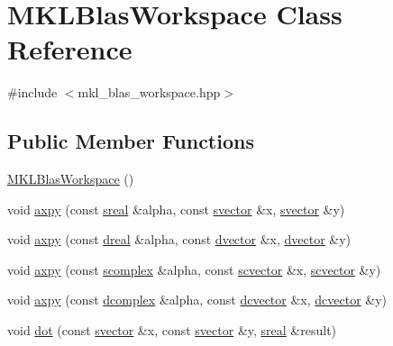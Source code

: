 \hypertarget{classMKLBlasWorkspace}{}\section{M\+K\+L\+Blas\+Workspace Class Reference}
\label{classMKLBlasWorkspace}


{\ttfamily \#include $<$mkl\+\_\+blas\+\_\+workspace.\+hpp$>$}

\subsection*{Public Member Functions}
\begin{DoxyCompactItemize}
\item 
\hyperlink{classMKLBlasWorkspace_a9aa5a080a9d51a2ea28177ae28b0ff44}{M\+K\+L\+Blas\+Workspace} ()
\item 
void \hyperlink{classMKLBlasWorkspace_a2582bcb54c81598e220d0120962b3a73}{axpy} (const \hyperlink{mkl__blas__workspace_8hpp_a10d897016764eb88fb8f180dcb1c8e1f}{sreal} \&alpha, const \hyperlink{mkl__blas__workspace_8hpp_a77c9c48c9aa9a7e72a489399e25b194b}{svector} \&x, \hyperlink{mkl__blas__workspace_8hpp_a77c9c48c9aa9a7e72a489399e25b194b}{svector} \&y)
\item 
void \hyperlink{classMKLBlasWorkspace_a5efedee62b0920bce8ff4112b7c29ea6}{axpy} (const \hyperlink{mkl__blas__workspace_8hpp_a7a5d10f247d1e172d0a54c8593e3e6a1}{dreal} \&alpha, const \hyperlink{mkl__blas__workspace_8hpp_a0bb644a430db3157d9ece9dc8fee2884}{dvector} \&x, \hyperlink{mkl__blas__workspace_8hpp_a0bb644a430db3157d9ece9dc8fee2884}{dvector} \&y)
\item 
void \hyperlink{classMKLBlasWorkspace_a5a0bcbcb3f1a20ccd57a4f21f2faa2e8}{axpy} (const \hyperlink{mkl__blas__workspace_8hpp_a06b0d8b7af9e07e86d8bd289f689899c}{scomplex} \&alpha, const \hyperlink{mkl__blas__workspace_8hpp_aea885c50e28a9bce0e30be490ca106f9}{scvector} \&x, \hyperlink{mkl__blas__workspace_8hpp_aea885c50e28a9bce0e30be490ca106f9}{scvector} \&y)
\item 
void \hyperlink{classMKLBlasWorkspace_a25f79e9b09c734e2d46ae7a38447ae8d}{axpy} (const \hyperlink{mkl__blas__workspace_8hpp_a15a84810a5fbd721f358d46fd9133541}{dcomplex} \&alpha, const \hyperlink{mkl__blas__workspace_8hpp_ac814e6b8e5ea1a7da83c5818c0a255a5}{dcvector} \&x, \hyperlink{mkl__blas__workspace_8hpp_ac814e6b8e5ea1a7da83c5818c0a255a5}{dcvector} \&y)
\item 
void \hyperlink{classMKLBlasWorkspace_a7137cfc3515ef1e950363ab355c6b4ed}{dot} (const \hyperlink{mkl__blas__workspace_8hpp_a77c9c48c9aa9a7e72a489399e25b194b}{svector} \&x, const \hyperlink{mkl__blas__workspace_8hpp_a77c9c48c9aa9a7e72a489399e25b194b}{svector} \&y, \hyperlink{mkl__blas__workspace_8hpp_a10d897016764eb88fb8f180dcb1c8e1f}{sreal} \&result)

\end{DoxyCompactItemize}
